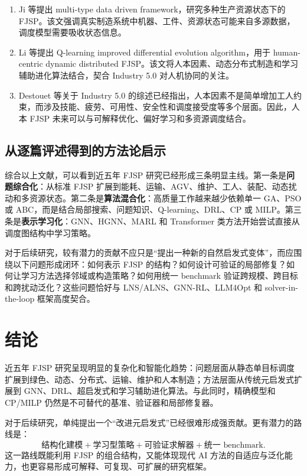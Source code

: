 \documentclass[UTF8,a4paper,11pt]{ctexart}
\begin{document}
\begin{enumerate}[label=\textbf{R\arabic*.},leftmargin=3em]
\item Ji 等提出 multi-type data driven framework，研究多种生产资源状态下的 FJSP\cite{Ji2025MultiType}。该文强调真实制造系统中机器、工件、资源状态可能来自多源数据，调度模型需要吸收状态信息。

\item Li 等提出 Q-learning improved differential evolution algorithm，用于 human-centric dynamic distributed FJSP\cite{Li2025HumanCentric}。该文将人本因素、动态分布式制造和学习辅助进化算法结合，契合 Industry 5.0 对人机协同的关注。

\item Destouet 等关于 Industry 5.0 的综述已经指出，人本因素不是简单增加工人约束，而涉及技能、疲劳、可用性、安全性和调度接受度等多个层面\cite{Destouet2023Industry5}。因此，人本 FJSP 未来可以与可解释优化、偏好学习和多资源调度结合。
\end{enumerate}

\subsection{从逐篇评述得到的方法论启示}

综合以上文献，可以看到近五年 FJSP 研究已经形成三条明显主线。第一条是\textbf{问题综合化}：从标准 FJSP 扩展到能耗、运输、AGV、维护、工人、装配、动态扰动和多资源状态。第二条是\textbf{算法混合化}：高质量工作越来越少依赖单一 GA、PSO 或 ABC，而是结合局部搜索、问题知识、Q-learning、DRL、CP 或 MILP。第三条是\textbf{表示学习化}：GNN、HGNN、MARL 和 Transformer 类方法开始尝试直接从调度图结构中学习策略。

对于后续研究，较有潜力的贡献不应只是“提出一种新的自然启发式变体”，而应围绕以下问题形成闭环：如何表示 FJSP 的结构？如何设计可验证的局部修复？如何让学习方法选择邻域或构造策略？如何用统一 benchmark 验证跨规模、跨目标和跨扰动泛化？这些问题恰好与 LNS/ALNS、GNN-RL、LLM4Opt 和 solver-in-the-loop 框架高度契合。


\section{结论}

近五年 FJSP 研究呈现明显的复杂化和智能化趋势：问题层面从静态单目标调度扩展到绿色、动态、分布式、运输、维护和人本制造；方法层面从传统元启发式扩展到 GNN、DRL、超启发式和学习辅助进化算法。与此同时，精确模型和 CP/MILP 仍然是不可替代的基准、验证器和局部修复器。

对于后续研究，单纯提出一个“改进元启发式”已经很难形成强贡献。更有潜力的路线是：
\[
\text{结构化建模} + \text{学习型策略} + \text{可验证求解器} + \text{统一 benchmark}.
\]
这一路线既能利用 FJSP 的组合结构，又能体现现代 AI 方法的自适应与泛化能力，也更容易形成可解释、可复现、可扩展的研究框架。
\end{document}
